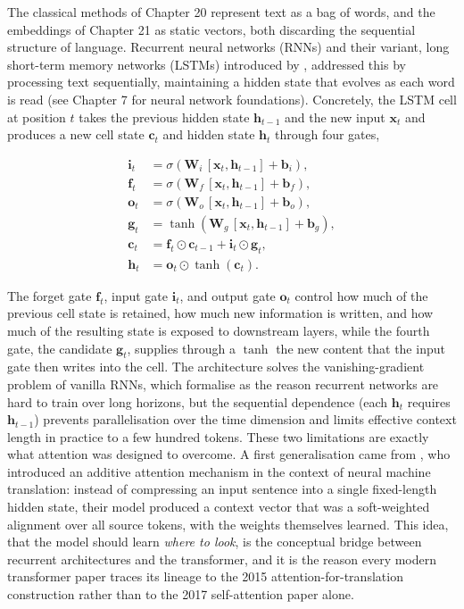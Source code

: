 The classical methods of Chapter 20 represent text as a bag of words, and the embeddings of Chapter 21 as static vectors, both discarding the sequential structure of language. Recurrent neural networks (RNNs) and their variant, long short-term memory networks (LSTMs) introduced by \cite{hochreiter1997long}, addressed this by processing text sequentially, maintaining a hidden state that evolves as each word is read (see Chapter 7 for neural network foundations). Concretely, the LSTM cell at position $t$ takes the previous hidden state $\mathbf{h}_{t -1}$ and the new input $\mathbf{x}_t$ and produces a new cell state $\mathbf{c}_t$ and hidden state $\mathbf{h}_t$ through four gates,

\begin{equation}
\begin{aligned}
\mathbf{i}_t &= \sigma(\mathbf{W}_i\, [\mathbf{x}_t, \mathbf{h}_{t-1}] + \mathbf{b}_i), \\
\mathbf{f}_t &= \sigma(\mathbf{W}_f\, [\mathbf{x}_t, \mathbf{h}_{t-1}] + \mathbf{b}_f), \\
\mathbf{o}_t &= \sigma(\mathbf{W}_o\, [\mathbf{x}_t, \mathbf{h}_{t-1}] + \mathbf{b}_o), \\
\mathbf{g}_t &= \tanh(\mathbf{W}_g\, [\mathbf{x}_t, \mathbf{h}_{t-1}] + \mathbf{b}_g), \\
\mathbf{c}_t &= \mathbf{f}_t \odot \mathbf{c}_{t-1} + \mathbf{i}_t \odot \mathbf{g}_t, \\
\mathbf{h}_t &= \mathbf{o}_t \odot \tanh(\mathbf{c}_t).
\end{aligned}
\tag{22.1}
\end{equation}

The forget gate $\mathbf{f}_t$, input gate $\mathbf{i}_t$, and output gate $\mathbf{o}_t$ control how much of the previous cell state is retained, how much new information is written, and how much of the resulting state is exposed to downstream layers, while the fourth gate, the candidate $\mathbf{g}_t$, supplies through a $\tanh$ the new content that the input gate then writes into the cell. The architecture solves the vanishing-gradient problem of vanilla RNNs, which \cite{pascanu2013difficulty} formalise as the reason recurrent networks are hard to train over long horizons, but the sequential dependence (each $\mathbf{h}_t$ requires $\mathbf{h}_{t -1}$) prevents parallelisation over the time dimension and limits effective context length in practice to a few hundred tokens. These two limitations are exactly what attention was designed to overcome. A first generalisation came from \cite{bahdanau2015attention}, who introduced an additive attention mechanism in the context of neural machine translation: instead of compressing an input sentence into a single fixed-length hidden state, their model produced a context vector that was a soft-weighted alignment over all source tokens, with the weights themselves learned. This idea, that the model should learn \textit{where to look}, is the conceptual bridge between recurrent architectures and the transformer, and it is the reason every modern transformer paper traces its lineage to the 2015 attention-for-translation construction rather than to the 2017 self-attention paper alone.

